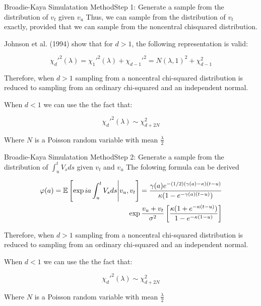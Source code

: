 \begin{frame}{Broadie-Kaya Simulatation Method}{Step 1: Generate a sample from the distribution of $v_t$ given $v_u$}
    Thus, we can sample from the distribution of $v_t$ exactly,
    provided that we can sample from the noncentral chisquared distribution.

    Johnson et al. (1994) show that for $d > 1$, the following representation is valid:


    \begin{equation}
        \chi_d'^{2}(\lambda) = \chi_1'^{2}(\lambda) + \chi_{d-1}'^{2} = N(\lambda, 1)^2 + \chi_{d-1}^{2}
    \end{equation}

    Therefore,  when $d > 1$ sampling from a noncentral chi-squared distribution
    is reduced to sampling from an ordinary chi-squared and
    an independent normal.

    When $d < 1$ we can use the the fact that:

    \begin{equation}
        \chi_d'^{2}(\lambda) \sim \chi_{d + 2N}^{2}
    \end{equation}

    Where $N$ is a Poisson random variable with mean $\frac{\lambda}{2}$

    
\end{frame}

\begin{frame}{Broadie-Kaya Simulatation Method}{Step 2:  Generate a sample from the distribution of $\int_{u}^t V_s ds$ given $v_t$ and $v_u$}
    The folowing formula can be derived 

    
    \begin{align}
        \varphi(a) = \mathbb{E}\left[  \exp{ia\int_{u}^t V_s ds} \Bigg| v_u, v_t\right] = \frac{\gamma(a)e^{-(1/2)(\gamma(a) - \kappa)(t - u)}}{\kappa(1-e^{-\gamma(a)(t-u)})} \\
        \exp{\frac{v_u + v_t}{\sigma^2} \left[  \frac{\kappa(1+e^{-\kappa(t-u)})}{1-e^{-\kappa(1-u)}}                 \right]     }
    \end{align}

    Therefore,  when $d > 1$ sampling from a noncentral chi-squared distribution
    is reduced to sampling from an ordinary chi-squared and
    an independent normal.

    When $d < 1$ we can use the the fact that:

    \begin{equation}
        \chi_d'^{2}(\lambda) \sim \chi_{d + 2N}^{2}
    \end{equation}

    Where $N$ is a Poisson random variable with mean $\frac{\lambda}{2}$
\end{frame}


